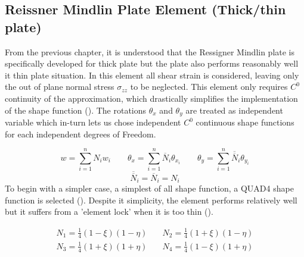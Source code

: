 \documentclass[main.tex]{subfiles}
\begin{document}
\subsection{Reissner Mindlin Plate Element (Thick/thin plate)}

From the previous chapter, it is understood that the Ressigner Mindlin plate is specifically developed for thick plate but the plate also performs reasonably well it thin plate situation. In this element all shear strain is considered, leaving only the out of plane normal stress $\sigma_{zz}$ to be neglected. This element only requires $C^0$ continuity of the approximation,  which drastically simplifies the implementation of the shape function (\cite{ANA_FEM_Plate_MIT}). The rotations $\theta_x$ and $\theta_y$ are treated as independent variable which in-turn lets us chose independent $C^0$ continuous shape functions for each independent degrees of Freedom.

\begin{equation}\label{eq:approx_disp_Ind}
w =  \sum_{i=1}^{n} N_iw_i
\qquad
\theta_x =  \sum_{i=1}^{n} \overline{N}_i\theta_{x_i}
\qquad
\theta_y =  \sum_{i=1}^{n} \overline{\overline{N}}_i\theta_{y_i}
\end{equation}
 \begin{equation*}
\overline{\overline{N}}_i = \overline{N}_i = N_i
 \end{equation*}
To begin with a simpler case, a simplest of all shape function, a QUAD4 shape function is selected  (\cite{MATLAB_FEM}). Despite it simplicity, the element performs relatively well but it suffers from a 'element lock' when it is too thin (\cite{doi:10.1002/nme.1620210213}).

 
\begin{equation}\label{eq:MITC4_SF}
\begin{split}
N_1  =\frac{1}{4}(1-\xi)(1 -\eta)\quad  
&
 N_2=\frac{1}{4}(1+\xi)(1-\eta) 
 \\
 N_3  =\frac{1}{4}(1+\xi)(1+ \eta)\quad  
 &
  N_4 =\frac{1}{4}(1-\xi)(1+\eta)\end{split}
\end{equation}
\end{document}
